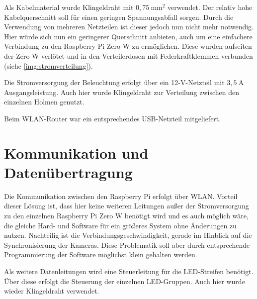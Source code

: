 \documentclass[./00PhotoBox.tex]{subfiles}
\begin{document}
Als Kabelmaterial wurde Klingeldraht mit $0,75~\text{mm}^2$ verwendet. Der relativ hohe Kabelquerschnitt soll für einen geringen Spannungsabfall sorgen. Durch die Verwendung von mehreren Netzteilen ist dieser jedoch nun nicht mehr notwendig. Hier würde sich nun ein geringerer Querschnitt anbieten, auch um eine einfachere Verbindung zu den Raspberry Pi Zero W zu ermöglichen. Diese wurden aufseiten der Zero W verlötet und in den Verteilerdosen mit Federkraftklemmen verbunden (siehe \autoref{img:stromverteilung}).

Die Stromversorgung der Beleuchtung erfolgt über ein 12-V-Netzteil mit $3,5~\text{A}$ Ausgangsleistung. Auch hier wurde Klingeldraht zur Verteilung zwischen den einzelnen Holmen genutzt.

Beim WLAN-Router war ein entsprechendes USB-Netzteil mitgeliefert.

\section{Kommunikation und Datenübertragung}
Die Kommunikation zwischen den Raspberry Pi erfolgt über WLAN. Vorteil dieser Lösung ist, dass hier keine weiteren Leitungen außer der Stromversorgung zu den einzelnen Raspberry Pi Zero W benötigt wird und es auch möglich wäre, die gleiche Hard- und Software für ein größeres System ohne Änderungen zu nutzen. Nachteilig ist die Verbindungsgeschwindigkeit, gerade im Hinblick auf die Synchronisierung der Kameras. Diese Problematik soll aber durch entsprechende Programmierung der Software möglichst klein gehalten werden.

Als weitere Datenleitungen wird eine Steuerleitung für die LED-Streifen benötigt. Über diese erfolgt die Steuerung der einzelnen LED-Gruppen. Auch hier wurde wieder Klingeldraht verwendet.

\biblio
\end{document}
